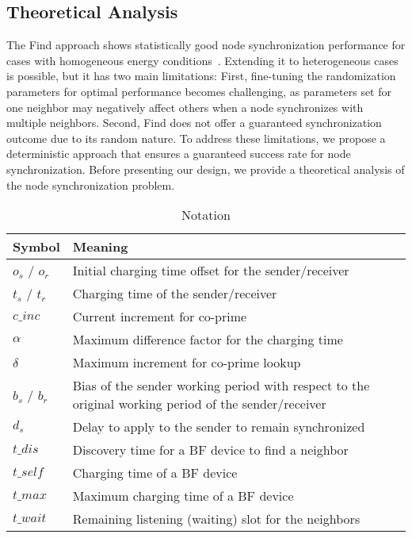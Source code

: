 \documentclass[lettersize,journal]{IEEEtran}
\begin{document}
\subsection{Theoretical Analysis}
The Find approach shows statistically good node synchronization performance for cases with homogeneous energy conditions~\cite{2021-nsdi-find}. Extending it to heterogeneous cases is possible, but it has two main limitations: First, fine-tuning the randomization parameters for optimal performance becomes challenging, as parameters set for one neighbor may negatively affect others when a node synchronizes with multiple neighbors. Second, Find does not offer a guaranteed synchronization outcome due to its random nature. To address these limitations, we propose a deterministic approach that ensures a guaranteed success rate for node synchronization. Before presenting our design, we provide a theoretical analysis of the node synchronization problem.

\begin{table}[!t]
\caption{Notation} \label{tab:notation}
\centering 
\begin{tabular}{lp{6cm}}
\toprule
\textbf{Symbol} & \textbf{Meaning} \\
\midrule
$o_s$ / $o_r$ & Initial charging time offset for the sender/receiver\\
$t_s$ / $t_r$ & Charging time of the sender/receiver \\
$c\_inc$ & Current increment for co-prime\\
$\alpha$& Maximum difference factor for the charging time\\
$\delta$& Maximum increment for co-prime lookup\\
$b_{s}$ / $b_{r}$ & Bias of the sender working period with respect to the original working period of the sender/receiver\\
$d_{s}$ & Delay to apply to the sender to remain synchronized\\
$t\_dis$ & Discovery time for a BF device to find a neighbor\\
$t\_self$ & Charging time of a BF device\\
$t\_max$ & Maximum charging time of a BF device\\
$t\_wait$&  Remaining listening (waiting) slot for the neighbors \\
\bottomrule
\end{tabular}
\label{tab:TableOfNotationForMyResearch}
\end{table}
\end{document}
